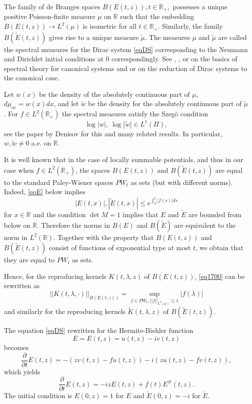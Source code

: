 \documentclass[11pt,twoside,reqno]{amsart}
\def\ti{\tilde}
\def\to{\rightarrow}
\def\pa{\partial}
\def\R{{\mathbb R}}
\def\l{\lambda}
\theoremstyle{plain}
\numberwithin{equation}{section}
\begin{document}
The family of de Branges spaces $B(E(t,z)), t\in\R_+,$ possesses a unique positive Poisson-finite measure $\mu$ on $\R$
such that the embedding $B(E(t,z))\to L^2(\mu)$ is isometric for all $t\in\R_+$.
Similarly, the family $B(\ti E(t,z))$ gives rise to a unique measure $\ti\mu$.
The measures  $\mu$ and $\ti\mu$ are called
 the spectral measures for the Dirac system \eqref{eqDS} corresponding to the Neumann and Dirichlet initial conditions at $0$
 correspondingly. See \cite{dBr}, \cite{R}, \cite{MIF1} or \cite{MP} on the basics of spectral theory for canonical systems
 and \cite{Den} or \cite{Ro} on the reduction of Dirac systems to the canonical case.
 
Let $w(x)$ be the density of the absolutely continuous part of $\mu$, $d\mu_{ac}=w(x)dx$, and
let $\ti w$ be the density for the absolutely continuous part of $\ti\mu$.
For $f\in L^2(\R_+)$ the spectral measures satisfy the Szeg\"o condition
$$\log |w|, \ \log |\ti w|\in L^1(\Pi),$$
see the paper by Denisov \cite{Den} for this and many related results.
In particular, $w,\ti w \neq 0$ a.e. on $\R$.


It is well known that in the case of locally summable potentials, and thus in our case when $f\in L^2(\R_+)$,
the spaces $B( E(t,z))$ and $B(\ti E(t,z))$ are equal to the standard Paley-Wiener spaces $PW_t$ as sets (but with different norms).
Indeed, \eqref{eqE} below implies
$$|E(t,x)|, |\ti E(t,x)|\leq e^{\int_0^t|f(s)|ds}$$
 for $x\in\R$ and the condition $\det M=1$ implies that $E$ and $\ti E$
are bounded from below on $\R$. Therefore the norms in $B(E)$ and $B(\ti E)$ are equivalent to the norm in $L^2(\R)$. Together with the property that
$B(E(t,z))$ and $B(\ti E(t,z))$ consist of functions of exponential type at most $t$, we obtain that they are equal to $PW_t$ as sets.

Hence, for the reproducing kernels $K(t,\l,z)$ of $B( E(t,z))$, \eqref{eq1700} can be rewritten as
$$||K(t,\l,\cdot)||_{B(E(t,z))}=\sup_{f\in PW_t, ||f||_{L^2(\mu)}\leq 1}|f(\l)|
$$
and similarly for the reproducing kernels  $\ti K(t,\l,z)$ of $B(\ti  E(t,z))$.


The  equation \eqref{eqDS} rewritten for the Hermite-Biehler function $$E=E(t,z)=u(t,z)-iv(t,z)$$ becomes
$$\frac \pa {\pa  t} E(t,z)= -(zv(t,z) -fu(t,z))-i (zu(t,z)-fv(t,z)),$$
which yields
\begin{equation} \frac \pa {\pa  t} E(t,z)=-izE(t,z) + f (t)E^\# (t,z).\label{eqE}\end{equation}
The initial condition is $E(0,z)=1$ for $E$ and $\ti E(0,z)=-i$ for $\ti E$. 
\end{document}
